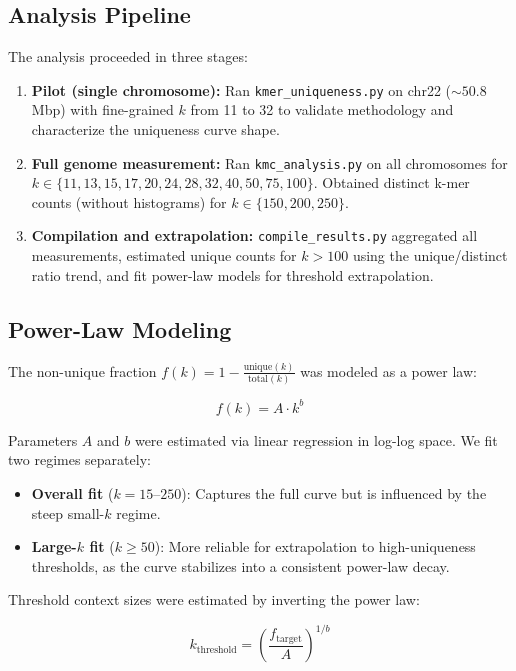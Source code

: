 \documentclass[11pt,a4paper]{article}
\begin{document}
\subsection{Analysis Pipeline}

The analysis proceeded in three stages:

\begin{enumerate}
    \item \textbf{Pilot (single chromosome):} Ran \texttt{kmer\_uniqueness.py} on chr22 (${\sim}50.8$\,Mbp) with fine-grained $k$ from 11 to 32 to validate methodology and characterize the uniqueness curve shape.
    \item \textbf{Full genome measurement:} Ran \texttt{kmc\_analysis.py} on all chromosomes for $k \in \{11, 13, 15, 17, 20, 24, 28, 32, 40, 50, 75, 100\}$. Obtained distinct k-mer counts (without histograms) for $k \in \{150, 200, 250\}$.
    \item \textbf{Compilation and extrapolation:} \texttt{compile\_results.py} aggregated all measurements, estimated unique counts for $k > 100$ using the unique/distinct ratio trend, and fit power-law models for threshold extrapolation.
\end{enumerate}

\subsection{Power-Law Modeling}

The non-unique fraction $f(k) = 1 - \frac{\text{unique}(k)}{\text{total}(k)}$ was modeled as a power law:

\[
f(k) = A \cdot k^{b}
\]

Parameters $A$ and $b$ were estimated via linear regression in log-log space. We fit two regimes separately:

\begin{itemize}
    \item \textbf{Overall fit} ($k = 15$--$250$): Captures the full curve but is influenced by the steep small-$k$ regime.
    \item \textbf{Large-$k$ fit} ($k \geq 50$): More reliable for extrapolation to high-uniqueness thresholds, as the curve stabilizes into a consistent power-law decay.
\end{itemize}

Threshold context sizes were estimated by inverting the power law:

\[
k_{\text{threshold}} = \left(\frac{f_{\text{target}}}{A}\right)^{1/b}
\]
\end{document}
